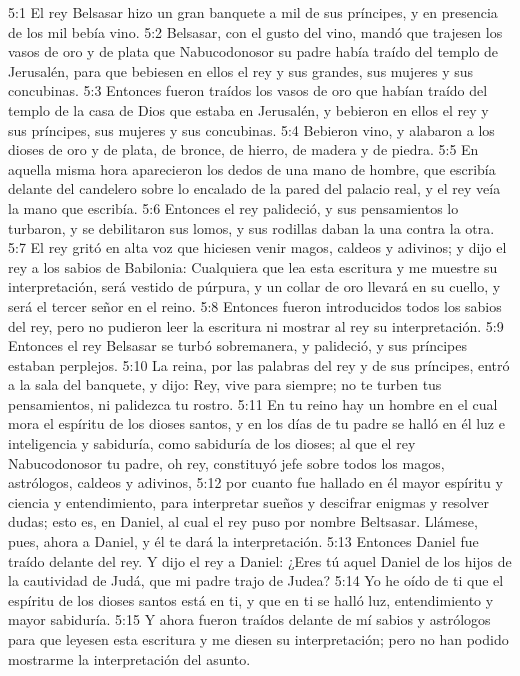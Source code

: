 5:1 El rey Belsasar hizo un gran banquete a mil de sus príncipes, y en presencia de los mil bebía vino. 
5:2 Belsasar, con el gusto del vino, mandó que trajesen los vasos de oro y de plata que Nabucodonosor su padre había traído del templo de Jerusalén, para que bebiesen en ellos el rey y sus grandes, sus mujeres y sus concubinas. 
5:3 Entonces fueron traídos los vasos de oro que habían traído del templo de la casa de Dios que estaba en Jerusalén, y bebieron en ellos el rey y sus príncipes, sus mujeres y sus concubinas. 
5:4 Bebieron vino, y alabaron a los dioses de oro y de plata, de bronce, de hierro, de madera y de piedra. 
5:5 En aquella misma hora aparecieron los dedos de una mano de hombre, que escribía delante del candelero sobre lo encalado de la pared del palacio real, y el rey veía la mano que escribía. 
5:6 Entonces el rey palideció, y sus pensamientos lo turbaron, y se debilitaron sus lomos, y sus rodillas daban la una contra la otra. 
5:7 El rey gritó en alta voz que hiciesen venir magos, caldeos y adivinos; y dijo el rey a los sabios de Babilonia: Cualquiera que lea esta escritura y me muestre su interpretación, será vestido de púrpura, y un collar de oro llevará en su cuello, y será el tercer señor en el reino. 
5:8 Entonces fueron introducidos todos los sabios del rey, pero no pudieron leer la escritura ni mostrar al rey su interpretación. 
5:9 Entonces el rey Belsasar se turbó sobremanera, y palideció, y sus príncipes estaban perplejos. 
5:10 La reina, por las palabras del rey y de sus príncipes, entró a la sala del banquete, y dijo: Rey, vive para siempre; no te turben tus pensamientos, ni palidezca tu rostro. 
5:11 En tu reino hay un hombre en el cual mora el espíritu de los dioses santos, y en los días de tu padre se halló en él luz e inteligencia y sabiduría, como sabiduría de los dioses; al que el rey Nabucodonosor tu padre, oh rey, constituyó jefe sobre todos los magos, astrólogos, caldeos y adivinos, 
5:12 por cuanto fue hallado en él mayor espíritu y ciencia y entendimiento, para interpretar sueños y descifrar enigmas y resolver dudas; esto es, en Daniel, al cual el rey puso por nombre Beltsasar. Llámese, pues, ahora a Daniel, y él te dará la interpretación. 
5:13 Entonces Daniel fue traído delante del rey. Y dijo el rey a Daniel: ¿Eres tú aquel Daniel de los hijos de la cautividad de Judá, que mi padre trajo de Judea? 
5:14 Yo he oído de ti que el espíritu de los dioses santos está en ti, y que en ti se halló luz, entendimiento y mayor sabiduría. 
5:15 Y ahora fueron traídos delante de mí sabios y astrólogos para que leyesen esta escritura y me diesen su interpretación; pero no han podido mostrarme la interpretación del asunto. 

